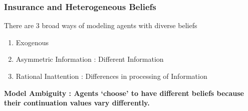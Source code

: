 \documentclass{beamer}
\theoremstyle{definition}
\begin{document}
\begin{frame}
\frametitle{Insurance and Heterogeneous Beliefs}
There are 3 broad ways of modeling agents with diverse beliefs
\begin{enumerate}
	\item Exogenous 
	\item Asymmetric Information : Different Information  
	\item Rational Inattention  : Differences in processing of Information
	
\end{enumerate}

\textbf{Model Ambiguity : Agents `choose' to have different beliefs because their continuation values vary differently. }
\end{frame}

\end{document}
